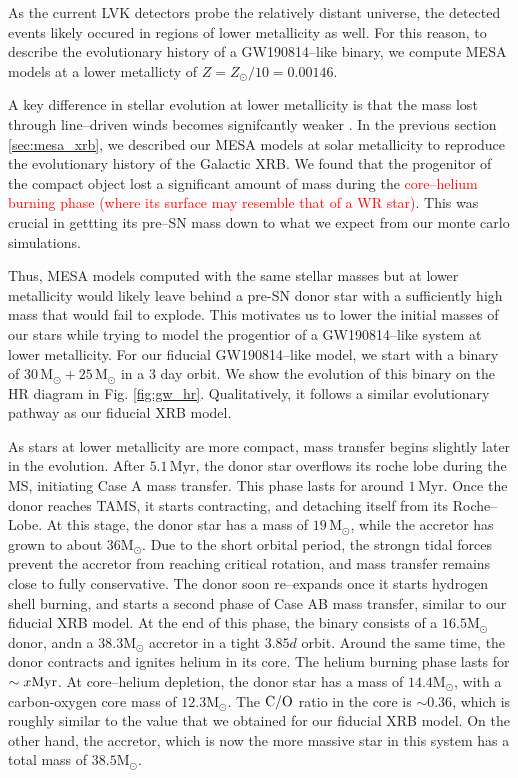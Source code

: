 \documentclass[linenumbers,trackchanges,twocolumn]{aastex701}
\newcommand{\Mdot}{\mathrm{M}_{\odot}}
\newcommand{\red}{\textcolor{red}}
\begin{document}
As the current LVK detectors probe the relatively distant universe, the detected events likely occured in regions of lower metallicity as well. For this reason, to describe the evolutionary history of a GW190814--like binary, we compute MESA models at a lower metallicty of $Z = Z_\odot/10 = 0.00146$.

A key difference in stellar evolution at lower metallicity is that the mass lost through line--driven winds becomes signifcantly weaker \cite{2001A&A...369..574V,2007A&A...473..603M}. In the previous section \ref{sec:mesa_xrb}, we described our MESA models at solar metallicity to reproduce the evolutionary history of the Galactic XRB. We found that the progenitor of the compact object lost a significant amount of mass during the \red{core--helium burning phase (where its surface may resemble that of a WR star)}. This was crucial in gettting its pre--SN mass down to what we expect from our monte carlo simulations. 

Thus, MESA models computed with the same stellar masses but at lower metallicity would likely leave behind a pre-SN donor star with a sufficiently high mass that would fail to explode. This motivates us to lower the initial masses of our stars while trying to model the progentior of a GW190814--like system at lower metallicity. For our fiducial GW190814--like model, we start with a binary of $30\,\Mdot+25\,\Mdot$ in a 3 day orbit. We show the evolution of this binary on the HR diagram in Fig. \ref{fig:gw_hr}. Qualitatively, it follows a similar evolutionary pathway as our fiducial XRB model. 

As stars at lower metallicity are more compact, mass transfer begins slightly later in the evolution. After $5.1 \,\mathrm{Myr}$, the donor star overflows its roche lobe during the MS, initiating Case A mass transfer. This phase lasts for around $1 \,\mathrm{Myr}$. Once the donor reaches TAMS, it starts contracting, and detaching itself from its Roche--Lobe. At this stage, the donor star has a mass of $19\,\Mdot$, while the accretor has grown to about $36\Mdot$. Due to the short orbital period, the strongn tidal forces prevent the accretor from reaching critical rotation, and mass transfer remains close to fully conservative. The donor soon re--expands once it starts hydrogen shell burning, and starts a second phase of Case AB mass transfer, similar to our fiducial XRB model. At the end of this phase, the binary consists of a $16.5\Mdot$ donor, andn a $38.3\Mdot$ accretor in a tight $3.85d$ orbit. Around the same time, the donor contracts and ignites helium in its core. The helium burning phase lasts for $\sim x \rm Myr$. At core--helium depletion, the donor star has a mass of $14.4\Mdot$, with a carbon-oxygen core mass of $12.3\Mdot$. The $\rm C/O$ ratio in the core is $\sim 0.36$, which is roughly similar to the value that we obtained for our fiducial XRB model. On the other hand, the accretor, which is now the more massive star in this system has a total mass of $38.5\Mdot$. 
\end{document}
